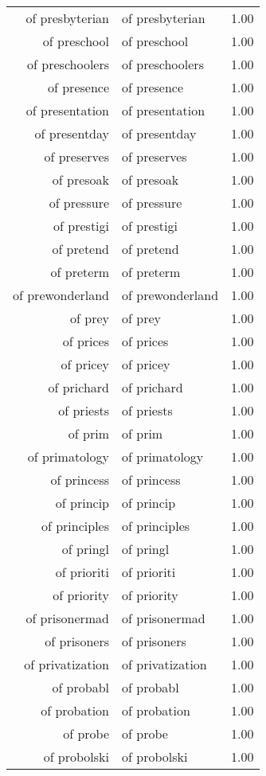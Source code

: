 \begin{table}[ht]
\begin{tabular}{rlr}
  of presbyterian & of presbyterian & 1.00 \\ 
  of preschool & of preschool & 1.00 \\ 
  of preschoolers & of preschoolers & 1.00 \\ 
  of presence & of presence & 1.00 \\ 
  of presentation & of presentation & 1.00 \\ 
  of presentday & of presentday & 1.00 \\ 
  of preserves & of preserves & 1.00 \\ 
  of presoak & of presoak & 1.00 \\ 
  of pressure & of pressure & 1.00 \\ 
  of prestigi & of prestigi & 1.00 \\ 
  of pretend & of pretend & 1.00 \\ 
  of preterm & of preterm & 1.00 \\ 
  of prewonderland & of prewonderland & 1.00 \\ 
  of prey & of prey & 1.00 \\ 
  of prices & of prices & 1.00 \\ 
  of pricey & of pricey & 1.00 \\ 
  of prichard & of prichard & 1.00 \\ 
  of priests & of priests & 1.00 \\ 
  of prim & of prim & 1.00 \\ 
  of primatology & of primatology & 1.00 \\ 
  of princess & of princess & 1.00 \\ 
  of princip & of princip & 1.00 \\ 
  of principles & of principles & 1.00 \\ 
  of pringl & of pringl & 1.00 \\ 
  of prioriti & of prioriti & 1.00 \\ 
  of priority & of priority & 1.00 \\ 
  of prisonermad & of prisonermad & 1.00 \\ 
  of prisoners & of prisoners & 1.00 \\ 
  of privatization & of privatization & 1.00 \\ 
  of probabl & of probabl & 1.00 \\ 
  of probation & of probation & 1.00 \\ 
  of probe & of probe & 1.00 \\ 
  of probolski & of probolski & 1.00 \\ 

\end{tabular}
\end{table}
